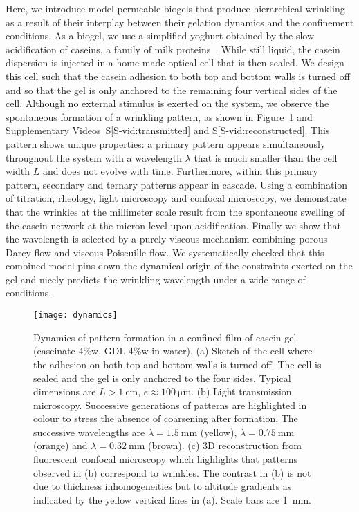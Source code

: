 \documentclass[twocolumn,superscriptaddress,showpacs,preprintnumbers, amsmath,amssymb,prl]{revtex4-1}
\begin{document}
Here, we introduce model permeable biogels that produce hierarchical wrinkling as a result of their interplay between their gelation dynamics and the confinement conditions. 
As a biogel, we use a simplified yoghurt obtained by the slow acidification of caseins, a family of milk proteins~\cite{Roefs1986,Bremer1989,Lucey1998,Dickinson2002}. While still liquid, the casein dispersion is injected in a home-made optical cell that is then sealed. We design this cell such that the casein adhesion to both top and bottom walls is turned off and so that the gel is only anchored to the remaining four vertical sides of the cell.
%
Although no external stimulus is exerted on the system, we observe the spontaneous formation of a wrinkling pattern, as shown in Figure~\ref{fig:dynamics} and Supplementary Videos~S\ref{S-vid:transmitted} and S\ref{S-vid:reconstructed}. This pattern shows unique properties: a primary pattern appears simultaneously throughout the system with a wavelength $\lambda$ that is much smaller than the cell width $L$ and does not evolve with time. Furthermore, within this primary pattern, secondary and ternary patterns appear in cascade.
Using a combination of titration, rheology, light microscopy and confocal microscopy, we demonstrate that the wrinkles at the millimeter scale result from the spontaneous swelling of the casein network at the micron level upon acidification.
%
Finally we show that the wavelength is selected by a purely viscous mechanism combining porous Darcy flow and viscous Poiseuille flow. We systematically checked that this combined model pins down the dynamical origin of the constraints exerted on the gel and nicely predicts the wrinkling wavelength under a wide range of conditions.


\begin{figure}
	\texttt{[image: dynamics]}%
	\caption{Dynamics of pattern formation in a confined film of casein gel (caseinate 4\%w, GDL 4\%w in water). (a) Sketch of the cell where the adhesion on both top and bottom walls is turned off. The cell is sealed and the gel is only anchored to the four sides. Typical dimensions are $L>\SI{1}{\centi\metre}$, $e\approx\SI{100}{\micro\metre}$. (b) Light transmission microscopy. Successive generations of patterns are highlighted in colour to stress the absence of coarsening after formation. The successive wavelengths are $\lambda=\SI{1.5}{\milli\metre}$ (yellow), $\lambda=\SI{0.75}{\milli\metre}$ (orange) and $\lambda=\SI{0.32}{\milli\metre}$ (brown). (c) 3D reconstruction from fluorescent confocal microscopy which highlights that patterns observed in (b) correspond to wrinkles. The contrast in (b) is not due to thickness inhomogeneities but to altitude gradients as indicated by the yellow vertical lines in (a). Scale bars are \SI{1}{\milli\metre}.}%
	\label{fig:dynamics}%
\end{figure}
\end{document}
